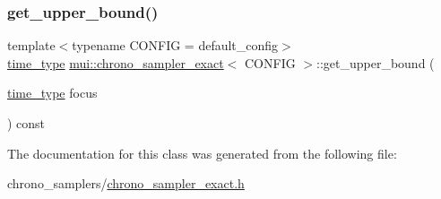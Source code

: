\mbox{\label{classmui_1_1chrono__sampler__exact_a1743254818f1f6fb5ef3eff5e7eef0c6}} 
\subsubsection{\texorpdfstring{get\+\_\+upper\+\_\+bound()}{get\_upper\_bound()}}
{\footnotesize\ttfamily template$<$typename C\+O\+N\+F\+IG  = default\+\_\+config$>$ \\
\hyperlink{classmui_1_1chrono__sampler__exact_a5f9178b26822fe901f8a1e97ada68d95}{time\+\_\+type} \hyperlink{classmui_1_1chrono__sampler__exact}{mui\+::chrono\+\_\+sampler\+\_\+exact}$<$ C\+O\+N\+F\+IG $>$\+::get\+\_\+upper\+\_\+bound (\begin{DoxyParamCaption}\item[{\hyperlink{classmui_1_1chrono__sampler__exact_a5f9178b26822fe901f8a1e97ada68d95}{time\+\_\+type}}]{focus }\end{DoxyParamCaption}) const\hspace{0.3cm}{\ttfamily [inline]}}



The documentation for this class was generated from the following file\+:\begin{DoxyCompactItemize}
\item 
chrono\+\_\+samplers/\hyperlink{chrono__sampler__exact_8h}{chrono\+\_\+sampler\+\_\+exact.\+h}\end{DoxyCompactItemize}
